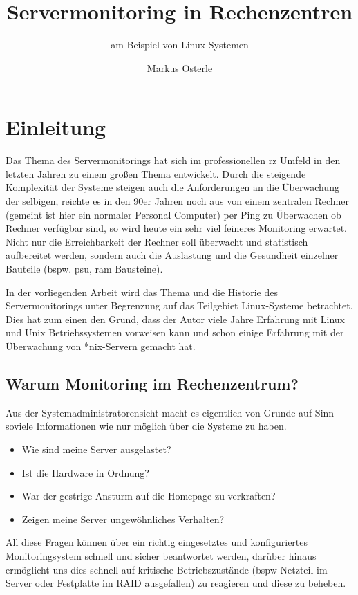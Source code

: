 \documentclass[12pt,a4paper,parskip]{scrreprt}
\begin{document}
	\subject{Seminararbeit im Studiengang \glqq Verwaltungsinformatik\grqq}
	\author{Markus Österle}
	\title{Servermonitoring in Rechenzentren}
	\subtitle{am Beispiel von Linux Systemen}
	\publishers{Betreut von Dipl. Inf. Stefan Müller}
	\date{} %

	\maketitle
	
	\tableofcontents
	\onehalfspacing
	\chapter{Einleitung}
	Das Thema des Servermonitorings hat sich im professionellen \acrshort{rz} Umfeld in den letzten Jahren zu einem großen Thema entwickelt. Durch die steigende Komplexität der Systeme steigen auch die Anforderungen an die Überwachung der selbigen, reichte es in den 90er Jahren noch aus von einem zentralen Rechner (gemeint ist hier ein normaler Personal Computer) per Ping zu Überwachen ob Rechner verfügbar sind, so wird heute ein sehr viel feineres Monitoring erwartet. Nicht nur die Erreichbarkeit der Rechner soll überwacht und statistisch aufbereitet werden, sondern auch die Auslastung und die Gesundheit einzelner Bauteile (bspw. \gls{psu}, \acrshort{ram} Bausteine). 

	In der vorliegenden Arbeit wird das Thema und die Historie des Servermonitorings unter Begrenzung auf das Teilgebiet Linux-Systeme betrachtet. Dies hat zum einen den Grund, dass der Autor viele Jahre Erfahrung mit Linux und Unix Betriebssystemen vorweisen kann und schon einige Erfahrung mit der Überwachung von *nix-Servern gemacht hat.
	\section{Warum Monitoring im Rechenzentrum?}
	Aus der Systemadministratorensicht macht es eigentlich von Grunde auf Sinn soviele Informationen wie nur möglich über die Systeme zu haben. 
	\begin{itemize}
		\item Wie sind meine Server ausgelastet?
		\item Ist die Hardware in Ordnung?
		\item War der gestrige Ansturm auf die Homepage zu verkraften?
		\item Zeigen meine Server ungewöhnliches Verhalten? 
	\end{itemize}
	  All diese Fragen können über ein richtig eingesetztes und konfiguriertes Monitoringsystem schnell und sicher beantwortet werden, darüber hinaus ermöglicht uns dies schnell auf kritische Betriebszustände (\acrlong{bspw} Netzteil im Server oder Festplatte im RAID ausgefallen) zu reagieren und diese zu beheben. 
	  
\end{document}
